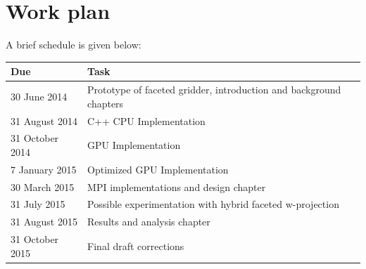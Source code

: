 \documentclass[a4paper, two column]{article}
\begin{document}
\section{Work plan}
A brief schedule is given below:\\
\begin{tabular}{|p{2.5cm}|p{5cm}|}
 \hline
 \textbf{Due} & \textbf{Task} \\
 \hline
 30 June 2014 & Prototype of faceted gridder, introduction and background chapters\\
 \hline
 31 August 2014 & C++ CPU Implementation\\
 \hline
 31 October 2014 & GPU Implementation\\
 \hline
 7 January 2015 & Optimized GPU Implementation\\
 \hline
 30 March 2015 & MPI implementations and design chapter\\
 \hline
 31 July 2015 & Possible experimentation with hybrid faceted w-projection\\
 \hline
 31 August 2015 & Results and analysis chapter\\
 \hline
 31 October 2015 & Final draft corrections \\
 \hline
\end{tabular}
{
{\footnotesize }

}
\end{document}
